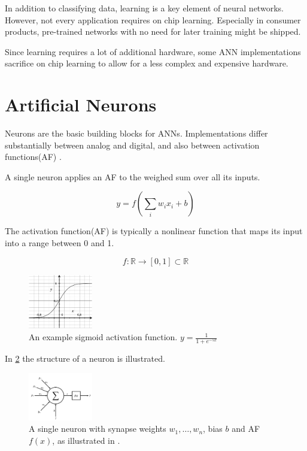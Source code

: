 \documentclass[conference]{IEEEtran}
\begin{document}
    In addition to classifying data, learning is a key element of neural networks.
    However, not every application requires on chip learning.
    Especially in consumer products, pre-trained networks with no need for later training might be shipped.

    Since learning requires a lot of additional hardware, some ANN implementations sacrifice on chip learning to allow for a less complex and expensive hardware.


    \section{Artificial Neurons}

    Neurons are the basic building blocks for ANNs.
    Implementations differ substantially between analog and digital, and also between activation functions(AF) \cite{habib1989digital}.

    A single neuron applies an AF to the weighed sum over all its inputs.

    \[y = f(\sum_i {w_ix_i} + b)\]

    The activation function(AF) is typically a nonlinear function that maps its input into a range between 0 and 1.

    \[ f: \mathbb{R} \to [0,1] \subset \mathbb{R} \]

    \begin{figure}[h]
        \centering
        \includegraphics[width=0.25\textwidth]{resources/sigmoid.pdf}
        \caption{An example sigmoid activation function. $y = \frac{1}{1+e^{-5x}}$}
        \label{fig:sigmoid}
    \end{figure}

    In \ref{fig:neuron} the structure of a neuron is illustrated.

    \begin{figure}[h]
        \centering
        \includegraphics[width=0.25\textwidth]{resources/neuron.png}
        \caption{A single neuron with synapse weights $w_1,\dots,w_n$, bias $b$ and AF $f(x)$, as illustrated in \cite[Fig.~1]{muthuramalingam2008neural}.}
        \label{fig:neuron}
    \end{figure}
\end{document}

